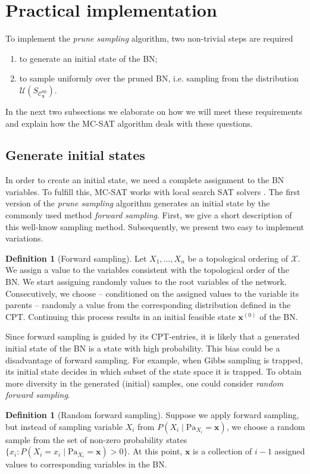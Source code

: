\documentclass[a4paper, twoside, 11pt]{report}
\newcommand{\bfx}{{\mathbf{x}}}
\newcommand{\C}{{\mathcal C}}
\newcommand{\U}{{\mathcal{U}}}
\theoremstyle{plain}
\theoremstyle{definition}
\newtheorem{definition}[thm]{Definition}
\theoremstyle{remark}
\newcommand{\X}{{\mathcal{X}}}
\newcommand{\ps}{\textit{prune sampling }}
\begin{document}
\section{Practical implementation}
To implement the \ps algorithm, two non-trivial steps are required
\begin{enumerate}
\item to generate an initial state of the BN;
\item to sample uniformly over the pruned BN, i.e. sampling from the distribution $\U(S_{\C_\bfx^{\text{np}}})$.
\end{enumerate}
In the next two subsections we elaborate on how we will meet these requirements and explain how the MC-SAT algorithm deals with these questions.

\subsection{Generate initial states}\label{sec:gen_init}
In order to create an initial state, we need a complete assignment to the BN variables. To fulfill this, MC-SAT works with local search SAT solvers \cite{poon2006sound}. The first version of the \ps algorithm generates an initial state by the commonly used method \textit{forward sampling}. First, we give a short description of this well-know sampling method. Subsequently, we present two easy to implement variations.
\begin{definition}[Forward sampling]
Let $X_1, \ldots , X_n$ be a topological ordering of $\X$. We assign a value to the variables consistent with the topological order of the BN. We start assigning randomly values to the root variables of the network. Consecutively, we choose -- conditioned on the assigned values to the variable its parents -- randomly a value from the corresponding distribution defined in the CPT. Continuing this process results in an initial feasible state $\bfx^{(0)}$ of the BN.
\end{definition}
Since forward sampling is guided by its CPT-entries, it is likely that a generated initial state of the BN is a state with high probability. This bias could be a disadvantage of forward sampling. For example, when Gibbs sampling is trapped, its initial state decides in which subset of the state space it is trapped. To obtain more diversity in the generated (initial) samples, one could consider \textit{random forward sampling}.
\begin{definition}[Random forward sampling]\label{def:rfs}
Suppose we apply forward sampling, but instead of sampling variable $X_i$ from $P(X_i \mid \text{Pa}_{X_i} = \mathbf{x})$, we choose a random sample from the set of non-zero probability states $\{x_i : P(X_i = x_i \mid \text{Pa}_{X_i}=\mathbf{x}) > 0\}$. At this point, $\bfx$ is a collection of $i-1$ assigned values to corresponding variables in the BN. 
\end{definition}
\end{document}
